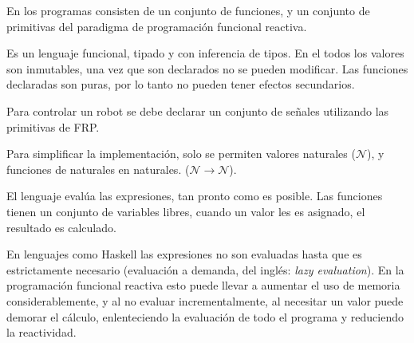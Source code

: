 
  En \frob{} los programas consisten de un conjunto de funciones, y un
conjunto de primitivas del paradigma de programación funcional reactiva.
  
  Es un lenguaje funcional, tipado y con inferencia de tipos.
  En el todos los valores son inmutables, una vez que son declarados
no se pueden modificar.
  Las funciones declaradas son puras, por lo tanto no pueden tener efectos
secundarios.

  Para controlar un robot se debe declarar un conjunto de señales utilizando
las primitivas de FRP.


  Para simplificar la implementación, solo se permiten valores
naturales ($\mathcal{N}$), y funciones de naturales en naturales. 
($\mathcal{N} \rightarrow \mathcal{N}$).

  El lenguaje evalúa las expresiones, tan pronto como es posible. Las
funciones tienen un conjunto de variables libres, cuando un valor les es
asignado, el resultado es calculado.
  
  En lenguajes como Haskell las expresiones no son evaluadas hasta que es
estrictamente necesario (evaluación a demanda,
del inglés: \emph{lazy evaluation}). En la programación funcional reactiva
esto puede llevar a aumentar el uso de memoria considerablemente, y al no
evaluar incrementalmente, al necesitar un valor puede demorar el cálculo,
enlenteciendo la evaluación de todo el programa y reduciendo la reactividad.


